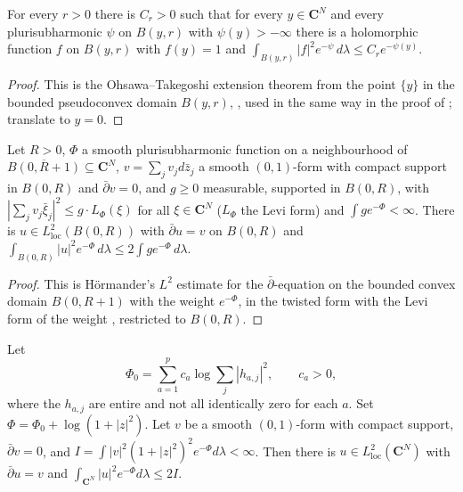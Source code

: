 \begin{lemma}\label{lem:c0-ot-point}
\leanok
For every $r>0$ there is $C_r>0$ such that for every $y\in\mathbf C^N$ and every plurisubharmonic $\psi$ on $B(y,r)$ with $\psi(y)>-\infty$
there is a holomorphic function $f$ on $B(y,r)$ with $f(y)=1$ and $\int_{B(y,r)}|f|^2e^{-\psi}\,d\lambda\le C_re^{-\psi(y)}$.
\end{lemma}

\begin{proof}
This is the Ohsawa--Takegoshi extension theorem from the point $\{y\}$ in the bounded pseudoconvex domain $B(y,r)$,
\cite[Corollary~13.9, Remark~13.10]{DemAM}, used in the same way in the proof of \cite[Theorem~14.2]{DemAM}; translate to $y=0$.
\end{proof}

\begin{lemma}\label{lem:c0-hormander-bounded}
\leanok
Let $R>0$, $\Phi$ a smooth plurisubharmonic function on a neighbourhood of $\overline{B(0,R+1)}\subseteq\mathbf C^N$, $v=\sum_jv_jd\bar z_j$ a
smooth $(0,1)$-form with compact support in $B(0,R)$ and $\bar\partial v=0$, and $g\ge0$ measurable, supported in $B(0,R)$, with
$|\sum_jv_j\bar\xi_j|^2\le g\cdot L_\Phi(\xi)$ for all $\xi\in\mathbf C^N$ ($L_\Phi$ the Levi form) and $\int g e^{-\Phi}<\infty$. There is
$u\in L^2_{\mathrm{loc}}(B(0,R))$ with $\bar\partial u=v$ on $B(0,R)$ and $\int_{B(0,R)}|u|^2e^{-\Phi}\,d\lambda\le2\int ge^{-\Phi}\,d\lambda$.
\end{lemma}

\begin{proof}
This is H\"ormander's $L^2$ estimate for the $\bar\partial$-equation on the bounded convex domain $B(0,R+1)$ with the weight
$e^{-\Phi}$, in the twisted form with the Levi form of the weight \cite[Theorems~5.1 and 5.2]{DemAM}, restricted to $B(0,R)$.
\end{proof}

\begin{lemma}\label{lem:c0-hormander-global}
\leanok
{}
Let
\[
 \Phi_0=\sum_{a=1}^pc_a\log\sum_j|h_{a,j}|^2,\qquad c_a>0,
\]
where the $h_{a,j}$ are entire and not all identically zero for each $a$. Set
$\Phi=\Phi_0+\log(1+|z|^2)$. Let $v$ be a smooth $(0,1)$-form with compact support, $\bar\partial v=0$, and
$I=\int|v|^2(1+|z|^2)^2e^{-\Phi}d\lambda<\infty$. Then there is $u\in L^2_{\mathrm{loc}}(\mathbf C^N)$ with $\bar\partial u=v$ and
$\int_{\mathbf C^N}|u|^2e^{-\Phi}d\lambda\le2I$.
\end{lemma}

